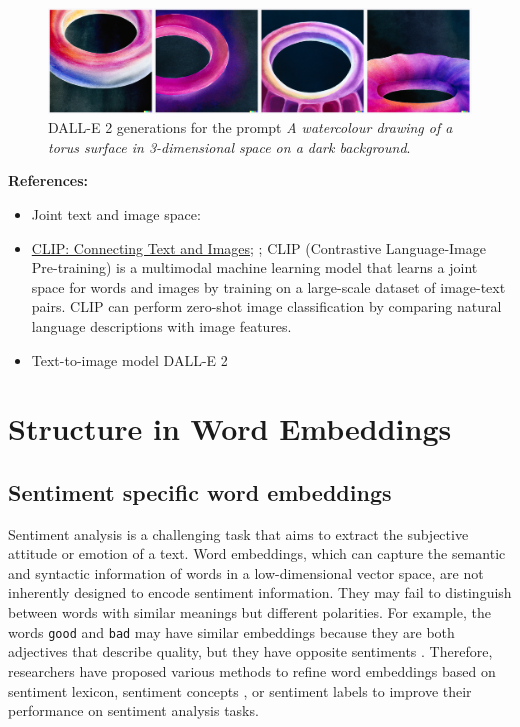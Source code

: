\documentclass[11pt, a4paper]{amsart}
\begin{document}
\begin{figure}
	\centering
	\includegraphics[width=\linewidth]{figures/text_to_image/DALLE2 A watercolour drawing of a torus surface in 3-dimensional space on a dark background.png}
	\caption{
		DALL-E 2 generations for the prompt \emph{A watercolour drawing of a torus surface in 3-dimensional space on a dark background}.
	}
	\label{fig:DALLE2_watercolour_torus_dark_background}
\end{figure}

\noindent \textbf{References:}
\begin{itemize}
	\item Joint text and image space:
	\cite{DBLP:journals/corr/abs-2111-07180}
	
	\item \href{https://openai.com/blog/clip/}{CLIP: Connecting Text and Images};
	\cite{radford2021learning};
	CLIP (Contrastive Language-Image Pre-training) is a multimodal machine learning model that learns a joint space for words and images by training on a large-scale dataset of image-text pairs.
	CLIP can perform zero-shot image classification by comparing natural language descriptions with image features.
	
	\item Text-to-image model DALL-E 2 \cite{Ramesh2022HierarchicalTI}
\end{itemize}

\section{Structure in Word Embeddings}

\subsection{Sentiment specific word embeddings}

Sentiment analysis is a challenging task that aims to extract the subjective attitude or emotion of a text.
Word embeddings, which can capture the semantic and syntactic information of words in a low-dimensional vector space, are not inherently designed to encode sentiment information.
They may fail to distinguish between words with similar meanings but different polarities.
For example, the words \texttt{good} and \texttt{bad} may have similar embeddings because they are both adjectives that describe quality, but they have opposite sentiments \cite{yu-etal-2017-refining}.
Therefore, researchers have proposed various methods to refine word embeddings based on sentiment lexicon, sentiment concepts \cite{wang2021sentimentconcept}, or sentiment labels to improve their performance on sentiment analysis tasks.
\end{document}
